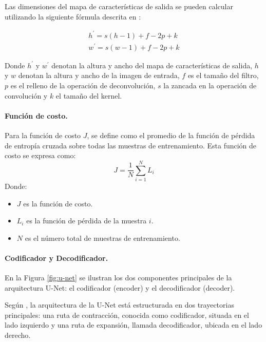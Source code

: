 Las dimensiones del mapa de características de salida se pueden calcular utilizando la siguiente fórmula descrita en \citet{somukesh_apply_2023}:

\begin{subequations}
    \begin{gather}
        h^{'} = s(h-1) + f - 2p + k \\
        w^{'} = s(w-1) + f - 2p + k
        \label{eq:deconvolution_size}
    \end{gather}
\end{subequations}

Donde $h^{'}$ y $w^{'}$ denotan la altura y ancho del mapa de características de salida, $h$  y $w$ denotan la altura y ancho de la imagen de entrada,
$f$ es el tamaño del filtro, $p$ es el relleno de la operación de deconvolución, $s$ la zancada en la operación de convolución y $k$ el tamaño del kernel.

\paragraph{Función de costo.}
Para \citet{balas_recent_2020} la función de costo $J$, se define como el promedio de la función de pérdida de entropía cruzada sobre todas las muestras de entrenamiento. Esta función de costo se expresa como:
\begin{equation}
    J = \frac{1}{N} \sum_{i=1}^{N} L_i
    \label{eq:cost_function}
\end{equation} 
Donde:
\begin{itemize}
    \item $J$ es la función de costo.
    \item $L_i$ es la función de pérdida de la muestra $i$.
    \item $N$ es el número total de muestras de entrenamiento.
\end{itemize}

\paragraph{Codificador y Decodificador.}
En la Figura \ref{fig:u-net} se ilustran los dos componentes principales de la arquitectura U-Net: el codificador (encoder) y el decodificador (decoder).

Según \citet{ronneberger_2015}, la arquitectura de la U-Net está estructurada en dos trayectorias principales: una ruta de contracción, conocida como codificador, 
situada en el lado izquierdo y una ruta de expansión, llamada decodificador, ubicada en el lado derecho.


